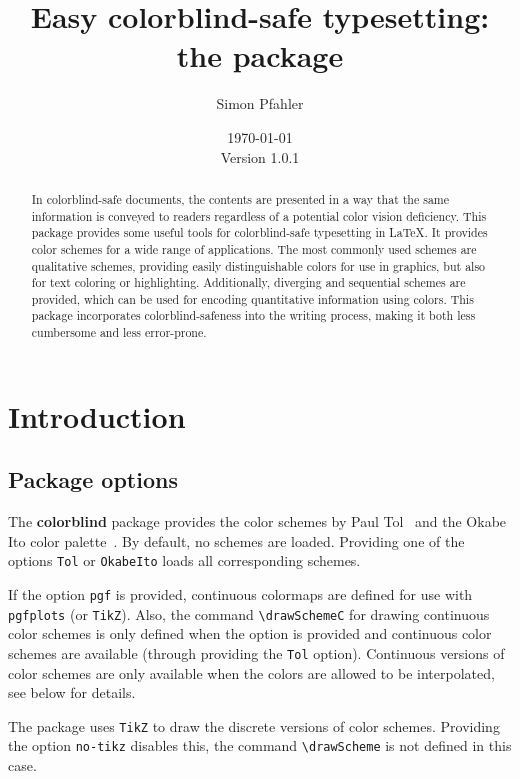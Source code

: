 \documentclass{scrartcl}
\title{Easy colorblind-safe typesetting:\\ the \colorblind package}
\author{Simon Pfahler}
\date{\today\\Version 1.0.1}
\newcommand\colorblind{\textbf{colorblind} }
\newcommand\marg[1]{\leavevmode\marginpar{\raggedleft #1}}
\newcommand\tbs{\textbackslash}
\newcommand\cs[1]{\texttt{\tbs#1}}
\begin{document}
\maketitle

\begin{abstract}
    In colorblind-safe documents, the contents are presented in a way that the same information is conveyed to readers regardless of a potential color vision deficiency.
    This package provides some useful tools for colorblind-safe typesetting in \LaTeX.
    It provides color schemes for a wide range of applications.
    The most commonly used schemes are qualitative schemes, providing easily distinguishable colors for use in graphics, but also for text coloring or highlighting.
    Additionally, diverging and sequential schemes are provided, which can be used for encoding quantitative information using colors.
    This package incorporates colorblind-safeness into the writing process, making it both less cumbersome and less error-prone.
\end{abstract}

\tableofcontents
\clearpage

\section{Introduction}
\subsection{Package options}
\marg{\texttt{Tol}\\\texttt{OkabeIto}}%
The \colorblind package provides the color schemes by Paul Tol~\cite{Tol} and the Okabe Ito color palette~\cite{Ichihara_2008}.
By default, no schemes are loaded.
Providing one of the options \texttt{Tol} or \texttt{OkabeIto} loads all corresponding schemes.

\marg{\texttt{pgf}}%
If the option \texttt{pgf} is provided, continuous colormaps are defined for use with \texttt{pgfplots} (or \texttt{TikZ}).
Also, the command \cs{drawSchemeC} for drawing continuous color schemes is only defined when the option is provided and continuous color schemes are available (through providing the \texttt{Tol} option).
Continuous versions of color schemes are only available when the colors are allowed to be interpolated, see below for details.

\marg{\texttt{no-tikz}}%
The package uses \texttt{TikZ} to draw the discrete versions of color schemes.
Providing the option \texttt{no-tikz} disables this, the command \cs{drawScheme} is not defined in this case.
\end{document}
